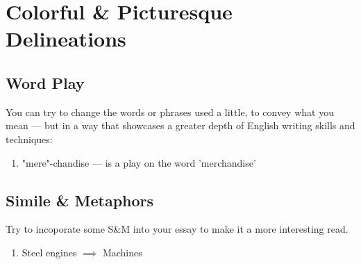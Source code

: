 \documentclass[oneside]{book}
\begin{document}
  \section{Colorful \& Picturesque Delineations}
\subsection{Word Play}
You can try to change the words or phrases used a little, to convey what you mean --- but in a way that showcases a greater depth of English writing skills and techniques:
\begin{enumerate}
    \item "mere"-chandise --- is a play on the word 'merchandise'
\end{enumerate}
\subsection{Simile \& Metaphors}
Try to incoporate some S\&M into your essay to make it a more interesting read.
\begin{enumerate}
    \item Steel engines \( \implies \) Machines
\end{enumerate}
\end{document}
